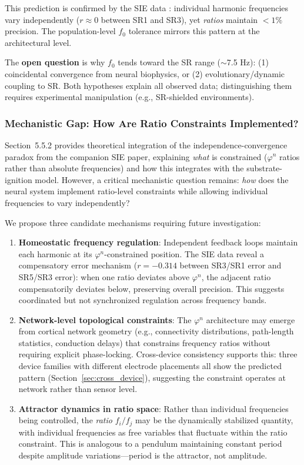 \documentclass[11pt,a4paper]{article}
\newcommand{\phisym}{\varphi}
\newcommand{\fzero}{f_0}
\begin{document}
This prediction is confirmed by the SIE data \citep{lacy_sie}: individual harmonic frequencies vary independently ($r \approx 0$ between SR1 and SR3), yet \textit{ratios} maintain $<1\%$ precision. The population-level $\fzero$ tolerance mirrors this pattern at the architectural level.

The \textbf{open question} is why $\fzero$ tends toward the SR range ($\sim$7.5 Hz): (1) coincidental convergence from neural biophysics, or (2) evolutionary/dynamic coupling to SR. Both hypotheses explain all observed data; distinguishing them requires experimental manipulation (e.g., SR-shielded environments).

\subsubsection{Mechanistic Gap: How Are Ratio Constraints Implemented?}

Section~5.5.2 provides theoretical integration of the independence-convergence paradox from the companion SIE paper, explaining \textit{what} is constrained ($\phisym^n$ ratios rather than absolute frequencies) and how this integrates with the substrate-ignition model. However, a critical mechanistic question remains: \textit{how} does the neural system implement ratio-level constraints while allowing individual frequencies to vary independently?

We propose three candidate mechanisms requiring future investigation:

\begin{enumerate}
    \item \textbf{Homeostatic frequency regulation}: Independent feedback loops maintain each harmonic at its $\phisym^n$-constrained position. The SIE data reveal a compensatory error mechanism ($r = -0.314$ between SR3/SR1 error and SR5/SR3 error): when one ratio deviates above $\phisym^n$, the adjacent ratio compensatorily deviates below, preserving overall precision. This suggests coordinated but not synchronized regulation across frequency bands.

    \item \textbf{Network-level topological constraints}: The $\phisym^n$ architecture may emerge from cortical network geometry (e.g., connectivity distributions, path-length statistics, conduction delays) that constrains frequency ratios without requiring explicit phase-locking. Cross-device consistency supports this: three device families with different electrode placements all show the predicted pattern (Section~\ref{sec:cross_device}), suggesting the constraint operates at network rather than sensor level.

    \item \textbf{Attractor dynamics in ratio space}: Rather than individual frequencies being controlled, the \textit{ratio} $f_i/f_j$ may be the dynamically stabilized quantity, with individual frequencies as free variables that fluctuate within the ratio constraint. This is analogous to a pendulum maintaining constant period despite amplitude variations---period is the attractor, not amplitude.
\end{enumerate}
\end{document}
